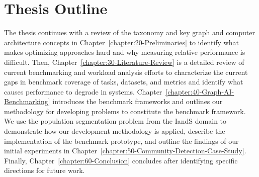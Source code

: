 \section{Thesis Outline}
\label{section:15-Thesis-Outline}
The thesis continues with a review of the \gai taxonomy and key graph and computer architecture concepts in Chapter~\ref{chapter:20-Preliminaries} to identify what makes optimizing \gai approaches hard and why measuring relative performance is difficult. 
Then, Chapter~\ref{chapter:30-Literature-Review} is a detailed review of current \gai benchmarking and workload analysis efforts to characterize the current gaps in benchmark coverage of \gai tasks, datasets, and metrics and identify what causes performance to degrade in \gai systems. 
Chapter~\ref{chapter:40-Graph-AI-Benchmarking} introduces the \gai benchmark frameworks and outlines our methodology for developing \gai problems to constitute the benchmark framework. 
We use the population segmentation problem from the \ac{IandS} domain to demonstrate how our development methodology is applied, describe the implementation of the \gai benchmark prototype, and outline the findings of our initial experiments in Chapter~\ref{chapter:50-Community-Detection-Case-Study}.
Finally, Chapter~\ref{chapter:60-Conclusion} concludes after identifying specific directions for future work.